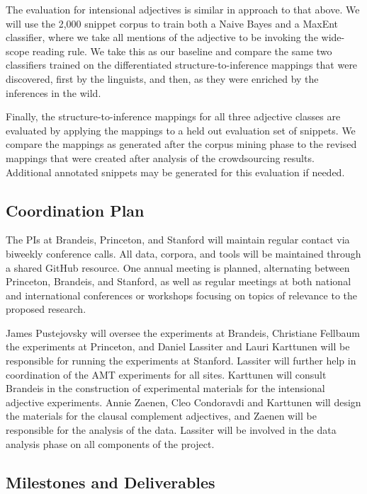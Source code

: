 \documentclass[10pt]{article}
\begin{document}
The evaluation for intensional adjectives is similar in approach to that above. We will use the 2,000 snippet corpus  to train both a Naive Bayes and a MaxEnt classifier, where we take all mentions of the adjective to be invoking the   wide-scope reading rule. We take this as our baseline and compare the same two classifiers trained on the differentiated structure-to-inference mappings that were discovered, first by the linguists, and then, as they were enriched by the inferences in the wild. 


Finally, the structure-to-inference mappings for all three adjective classes are evaluated by applying the mappings to a held out evaluation set of snippets. We compare the mappings as generated after the corpus mining phase to the revised mappings that were created after analysis of the crowdsourcing results. Additional annotated snippets may be generated for this evaluation if needed. 

\vspace {-2mm}
\vspace {-2mm}
\subsection{Coordination Plan}
\vspace {-2mm}

The PIs at Brandeis, Princeton, and Stanford will maintain regular contact via biweekly  conference calls. 
All data, corpora, and tools will be maintained through a shared GitHub resource. 
One annual meeting is planned, alternating between Princeton, Brandeis, and Stanford, as well as regular meetings at both national and international conferences or workshops focusing on topics of relevance to the proposed research. 

James Pustejovsky will oversee the experiments at Brandeis, Christiane Fellbaum the experiments at Princeton, and Daniel Lassiter and Lauri Karttunen will be responsible for running the experiments at Stanford.  Lassiter will further help in coordination of the AMT experiments for all sites.  Karttunen will consult Brandeis in the construction of experimental materials for the intensional adjective experiments.  Annie Zaenen, Cleo Condoravdi and  Karttunen will design the materials for the clausal complement adjectives, and Zaenen will be responsible for the analysis of the data.  Lassiter will be involved in the data analysis phase on all components of the project. 


\vspace {-2mm}
\vspace {-2mm}

\subsection{Milestones and Deliverables}
\vspace {-1mm}
\end{document}
